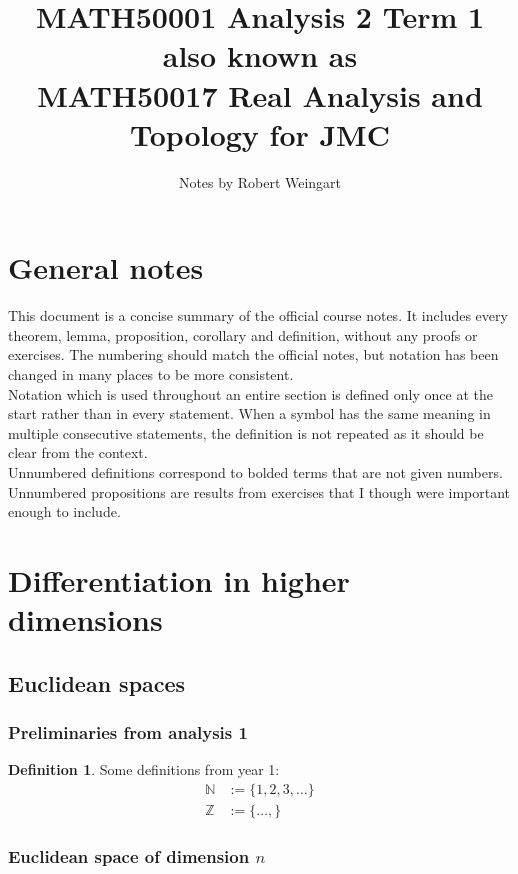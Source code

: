 \documentclass[12pt]{article}
\title{MATH50001 Analysis 2 Term 1\\{\Large also known as}\\MATH50017 Real Analysis and Topology for JMC}
\author{Notes by Robert Weingart}
\date{}
\theoremstyle{definition}
\newtheorem*{defn*}{Definition}
\begin{document}
\maketitle

\tableofcontents

\section*{General notes}

This document is a concise summary of the official course notes.
It includes every theorem, lemma, proposition, corollary and definition, without any proofs or exercises.
The numbering should match the official notes, but notation has been changed in many places to be more consistent.\\

\noindent Notation which is used throughout an entire section is defined only once at the start rather than in every statement.
When a symbol has the same meaning in multiple consecutive statements, the definition is not repeated as it should be clear from the context.\\

\noindent Unnumbered definitions correspond to bolded terms that are not given numbers.
Unnumbered propositions are results from exercises that I though were important enough to include.

\section{Differentiation in higher dimensions}

\subsection{Euclidean spaces}

\subsubsection{Preliminaries from analysis 1}

\begin{defn*}
	Some definitions from year 1:
	\begin{align*}
		\mathbb{N} &:= \{1, 2, 3, \ldots\}\\
		\mathbb{Z} &:= \{\ldots, \}
	\end{align*}
\end{defn*}

\subsubsection{Euclidean space of dimension $n$}
\end{document}
